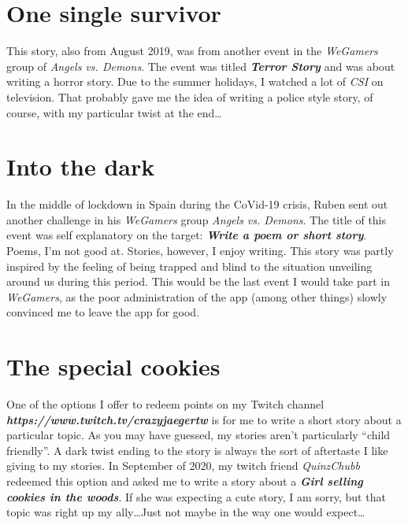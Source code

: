 \documentclass[a4paper,onecolumn,11pt]{article}
\begin{document}
\section{One single survivor}

This story, also from August 2019, was from another event in the \textit{WeGamers} group of \textit{Angels vs. Demons}. The event was titled \textbf{\textit{Terror Story}} and was about writing a horror story. Due to the summer holidays, I watched a lot of \textit{CSI} on television. That probably gave me the idea of writing a police style story, of course, with my particular twist at the end\ldots


\section{Into the dark}

In the middle of lockdown in Spain during the CoVid-19 crisis,  Ruben sent out another challenge in his \textit{WeGamers} group \textit{Angels vs. Demons}. The title of this event was self explanatory on the target: \textbf{\textit{Write a poem or short story}}. Poems, I'm not good at. Stories, however, I enjoy writing. This story was partly inspired by the feeling of being trapped and blind to the situation unveiling around us during this period. This would be the last event I would take part in \textit{WeGamers}, as the poor administration of the app (among other things) slowly convinced me to leave the app for good.


\section{The special cookies}

One of the options I offer to redeem points on my Twitch channel \textbf{\textit{https://www.twitch.tv/crazyjaegertw}} is for me to write a short story about a particular topic. As you may have guessed, my stories aren't particularly ``child friendly''. A dark twist ending to the story is always the sort of aftertaste I like giving to my stories.
In September of 2020, my twitch friend \textit{QuinzChubb} redeemed this option and asked me to write a story about a \textbf{\textit{Girl selling cookies in the woods}}. If she was expecting a cute story, I am sorry, but that topic was right up my ally\ldots Just not maybe in the way one would expect\ldots
\end{document}
